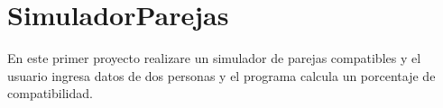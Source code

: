 \chapter{Simulador\+Parejas }
\hypertarget{md__r_e_a_d_m_e}{}\label{md__r_e_a_d_m_e}
\label{md__r_e_a_d_m_e_autotoc_md0}%
%


En este primer proyecto realizare un simulador de parejas compatibles y el usuario ingresa datos de dos personas y el programa calcula un porcentaje de compatibilidad. 